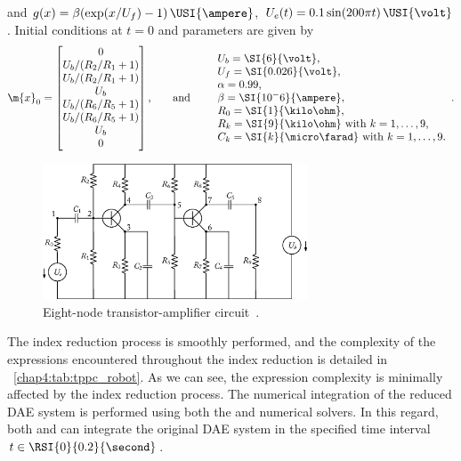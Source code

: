 %
and $g(x) = \beta(\exp(x/U_f) - 1)\,\USI{\ampere}$, $U_e(t) = 0.1\sin(200 \pi t)\,\USI{\volt}$. Initial conditions at $t = 0$ and parameters are given by
%
\begin{equation*}
  \m{x}_0 = \begin{bmatrix}
    0 \\
    U_b/(R_2/R_1 + 1) \\
    U_b/(R_2/R_1 + 1) \\
    U_b \\
    U_b/(R_6/R_5 + 1) \\
    U_b/(R_6/R_5 + 1) \\
    U_b \\
    0 \\
  \end{bmatrix} \text{,}
  \qquad \text{and} \qquad
  \begin{array}{l}
    U_b = \SI{6}{\volt} \text{,} \\
    U_f = \SI{0.026}{\volt} \text{,} \\
    \alpha = 0.99 \text{,} \\
    \beta = \SI{10^-6}{\ampere} \text{,} \\
    R_0 = \SI{1}{\kilo\ohm} \text{,} \\
    R_k = \SI{9}{\kilo\ohm} ~ \text{with} ~ k=1, \dots, 9 \text{,} \\
    C_k = \SI{k}{\micro\farad} ~ \text{with} ~ k=1, \dots, 9 \text{.} \\
  \end{array} \text{.}
\end{equation*}

\begin{figure}
  \centering
  \includegraphics[width=0.7\textwidth]{figures/chapter_4/transistor_amplifier.eps}
  \caption{Eight-node transistor-amplifier circuit~\cite{lioen1998test, mazzia2008test}.}
  \label{chap4:fig:transistor_amplifier}
\end{figure}

The index reduction process is smoothly performed, and the complexity of the expressions encountered throughout the index reduction is detailed in \tablename{}~\ref{chap4:tab:tppc_robot}. As we can see, the expression complexity is minimally affected by the index reduction process. The numerical integration of the reduced \ac{DAE} system is performed using both the \Maple{} and \Indigo{} numerical solvers. In this regard, both \Maple{} and \Indigo{} can integrate the original \ac{DAE} system in the specified time interval $t \in \RSI{0}{0.2}{\second}$.

